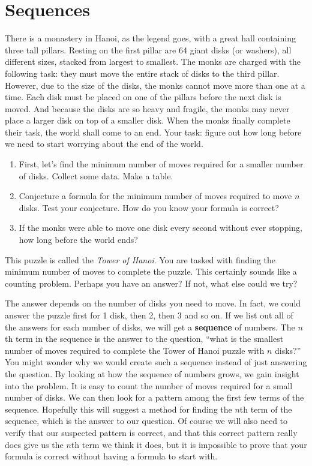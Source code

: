 \documentclass[11pt,]{book}
\newcommand{\terminology}[1]{\textbf{#1}}
\theoremstyle{ptxplainnotitle}
\theoremstyle{ptxplaintitle}
\theoremstyle{ptxdefinitionnotitle}
\theoremstyle{ptxdefinitiontitle}
\theoremstyle{ptxdefinitionnotitle}
\theoremstyle{ptxdefinitiontitle}
\theoremstyle{ptxdefinitionnotitle}
\theoremstyle{ptxdefinitiontitle}
\theoremstyle{ptxdefinitiontitlenonumber}
\theoremstyle{ptxdefinitiontitlenonumber}
\numberwithin{equation}{chapter}
\begin{document}
\chapter[{Sequences}]{Sequences}\label{ch_sequences}
\begin{investigation}\label{investigation-1}
\hypertarget{p-15}{}%
There is a monastery in Hanoi, as the legend goes, with a great hall containing three tall pillars. Resting on the first pillar are 64 giant disks (or washers), all different sizes, stacked from largest to smallest. The monks are charged with the following task: they must move the entire stack of disks to the third pillar. However, due to the size of the disks, the monks cannot move more than one at a time. Each disk must be placed on one of the pillars before the next disk is moved. And because the disks are so heavy and fragile, the monks may never place a larger disk on top of a smaller disk. When the monks finally complete their task, the world shall come to an end. Your task: figure out how long before we need to start worrying about the end of the world. %
\begin{enumerate}
\item\hypertarget{li-1}{}\hypertarget{p-16}{}%
First, let's find the minimum number of moves required for a smaller number of disks. Collect some data. Make a table.%
\item\hypertarget{li-2}{}\hypertarget{p-17}{}%
Conjecture a formula for the minimum number of moves required to move \(n\) disks. Test your conjecture. How do you know your formula is correct?%
\item\hypertarget{li-3}{}\hypertarget{p-18}{}%
If the monks were able to move one disk every second without ever stopping, how long before the world ends?%
\end{enumerate}
%
\end{investigation}
\hypertarget{p-19}{}%
This puzzle is called the \emph{Tower of Hanoi}. You are tasked with finding the minimum number of moves to complete the puzzle. This certainly sounds like a counting problem. Perhaps you have an answer? If not, what else could we try?%
\par
\hypertarget{p-20}{}%
The answer depends on the number of disks you need to move. In fact, we could answer the puzzle first for 1 disk, then 2, then 3 and so on. If we list out all of the answers for each number of disks, we will get a \terminology{sequence} of numbers. The \(n\)th term in the sequence is the answer to the question, ``what is the smallest number of moves required to complete the Tower of Hanoi puzzle with \(n\) disks?'' You might wonder why we would create such a sequence instead of just answering the question. By looking at how the sequence of numbers grows, we gain insight into the problem. It is easy to count the number of moves required for a small number of disks. We can then look for a pattern among the first few terms of the sequence. Hopefully this will suggest a method for finding the \(n\)th term of the sequence, which is the answer to our question. Of course we will also need to verify that our suspected pattern is correct, and that this correct pattern really does give us the \(n\)th term we think it does, but it is impossible to prove that your formula is correct without having a formula to start with.%
\end{document}
